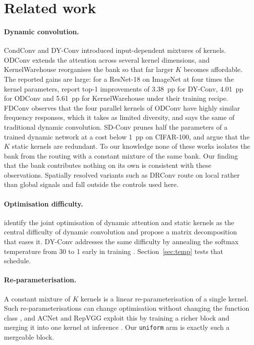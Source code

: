 \documentclass[10pt,a4paper]{article}
\begin{document}
\section{Related work}

\paragraph{Dynamic convolution.} CondConv \citep{yang2019condconv} and
DY-Conv \citep{chen2020dynamic} introduced input-dependent mixtures of
kernels. ODConv \citep{li2022odconv} extends the attention across several
kernel dimensions, and KernelWarehouse \citep{li2024kernelwarehouse}
reorganises the bank so that far larger $K$ becomes affordable. The
reported gains are large: for a ResNet-18 on ImageNet at four times the
kernel parameters, \citet{li2024kernelwarehouse} report top-1
improvements of \SI{3.38}{pp} for DY-Conv, \SI{4.01}{pp} for ODConv and
\SI{5.61}{pp} for KernelWarehouse under their training recipe. FDConv
\citep{chen2025fdconv} observes that the four parallel kernels of ODConv
have highly similar frequency responses, which it takes as limited
diversity, and says the same of traditional dynamic convolution. SD-Conv \citep{he2023sdconv} prunes half the
parameters of a trained dynamic network at a cost below \SI{1}{pp} on
CIFAR-100, and \citet{li2021dcd} argue that the $K$ static kernels are
redundant. To our knowledge none of these works isolates the bank from the
routing with a constant mixture of the same bank. Our finding that the
bank contributes nothing on its own is consistent with these
observations. Spatially resolved variants
such as DRConv \citep{chen2021drconv} route on local rather than global
signals and fall outside the controls used here.

\paragraph{Optimisation difficulty.} \citet{li2021dcd} identify the joint
optimisation of dynamic attention and static kernels as the central
difficulty of dynamic convolution and propose a matrix decomposition that
eases it. DY-Conv addresses the same difficulty by annealing the softmax
temperature from 30 to 1 early in training \citep{chen2020dynamic}.
Section~\ref{sec:temp} tests that schedule.

\paragraph{Re-parameterisation.} A constant mixture of $K$ kernels is a
linear re-parameterisation of a single kernel. Such re-parameterisations
can change optimisation without changing the function class
\citep{arora2018optimization}, and ACNet and RepVGG exploit this by
training a richer block and merging it into one kernel at inference
\citep{ding2019acnet,ding2021repvgg}. Our \texttt{uniform} arm is exactly
such a mergeable block.
\end{document}
